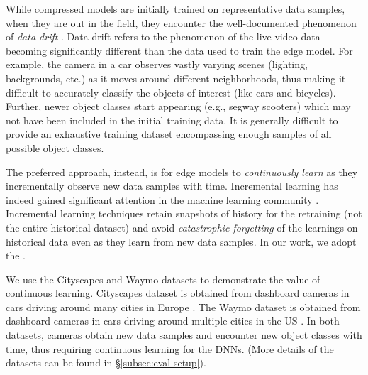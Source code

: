 While compressed models are initially trained on representative data samples, when they are out in the field, they encounter the well-documented phenomenon of {\em data drift} \cite{drift1, drift2}. Data drift refers to the phenomenon of the live video data becoming significantly different than the data used to train the edge model. For example, the camera in a car observes vastly varying scenes (lighting, backgrounds, etc.) as it moves around different neighborhoods, thus making it difficult to accurately classify the objects of interest (like cars and bicycles). Further, newer object classes start appearing (e.g., segway scooters) which may not have been included in the initial training data. It is generally difficult to provide an exhaustive training dataset encompassing enough samples of all possible object classes.   

The preferred approach, instead, is for edge models to {\em continuously learn} as they incrementally observe new data samples with time. Incremental learning has indeed gained significant attention in the machine learning community \cite{incremental1, incremental2, incremental3}. Incremental learning techniques retain snapshots of history for the retraining (not the entire historical dataset) and avoid {\em catastrophic forgetting} of the learnings on historical data \cite{catastrophic} even as they learn from new data samples. In our work, we adopt the .

 We use the Cityscapes and Waymo datasets \cite{sun2019scalability, cityscapes} to demonstrate the value of continuous learning. Cityscapes dataset is obtained from dashboard cameras in cars driving around many cities in Europe \cite{cityscapes}. The Waymo dataset is obtained from dashboard cameras in cars driving around multiple cities in the US \cite{sun2019scalability}. In both datasets, cameras obtain new data samples and encounter new object classes with time, thus requiring continuous learning for the DNNs. (More details of the datasets can be found in \S\ref{subsec:eval-setup}). 


